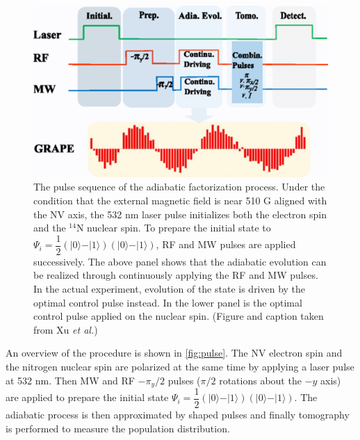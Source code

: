 \documentclass[%
 reprint,
 amsmath,amssymb,
 aps,
]{revtex4-1}
\begin{document}
	\begin{figure}
	\includegraphics[scale=0.49]{Fig2XuEtAl}
	\caption{	
		The pulse sequence of the adiabatic factorization process. Under the condition that the external magnetic field is near 510 G aligned with the NV axis, the 532 nm laser pulse initializes both the electron spin and the $^{14}$N nuclear spin. To prepare the initial state to $\Psi_i = \dfrac{1}{2}\left(\vert 0 \rangle - \vert 1 \rangle   \right)\left(\vert 0 \rangle - \vert 1 \rangle   \right)$, RF and MW pulses are applied successively. The above panel shows that the adiabatic evolution can be realized through continuously applying the RF and MW pulses. In the actual experiment, evolution of the state is driven by the optimal control pulse instead. In the lower panel is the optimal control pulse applied on the nuclear spin. (Figure and caption taken from Xu \textit{et al.}\cite{Xu2017})
	}	
	\end{figure}
	\label{fig:pulse}
	
	An overview of the procedure is shown in \ref{fig:pulse}. The NV electron spin and the nitrogen nuclear spin are polarized at the same time by applying a laser pulse at 532 nm. Then MW and RF $-\pi_y/2$ pulses ($\pi/2$ rotations about the $-y$ axis) are applied to prepare the initial state $\Psi_i = \dfrac{1}{2}\left(\vert 0 \rangle - \vert 1 \rangle   \right)\left(\vert 0 \rangle - \vert 1 \rangle   \right)$. The adiabatic process is then approximated by shaped pulses and finally tomography is performed to measure the population distribution. 
\end{document}
